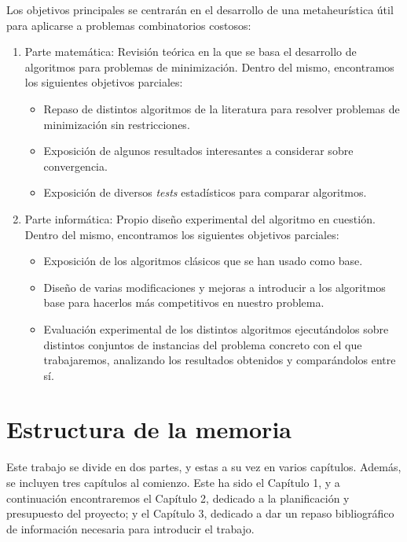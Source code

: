 Los objetivos principales se centrarán en el desarrollo de una metaheurística útil para aplicarse a problemas combinatorios costosos:
\begin{enumerate}
	\item Parte matemática: Revisión teórica en la que se basa el desarrollo de algoritmos para problemas de minimización. 
	Dentro del mismo, encontramos los siguientes objetivos parciales:
	\begin{itemize}
		\item Repaso de distintos algoritmos de la literatura para resolver problemas de minimización sin restricciones. 
		\item Exposición de algunos resultados interesantes a considerar sobre convergencia. 
		\item Exposición de diversos \textit{tests} estadísticos para comparar algoritmos. 
	\end{itemize}
	
	\item Parte informática: Propio diseño experimental del algoritmo en cuestión. 
	Dentro del mismo, encontramos los siguientes objetivos parciales: 
	\begin{itemize}
		\item Exposición de los algoritmos clásicos que se han usado como base.
		\item Diseño de varias modificaciones y mejoras a introducir a los algoritmos base para hacerlos más competitivos en nuestro problema. 
		\item Evaluación experimental de los distintos algoritmos ejecutándolos sobre distintos conjuntos de instancias del problema concreto con el que trabajaremos, analizando los resultados obtenidos y comparándolos entre sí.
	\end{itemize}
	
\end{enumerate}

\section{Estructura de la memoria}

Este trabajo se divide en dos partes, y estas a su vez en varios capítulos. 
Además, se incluyen tres capítulos al comienzo. 
Este ha sido el Capítulo 1, y a continuación encontraremos el Capítulo 2, dedicado a la planificación y presupuesto del proyecto; y el Capítulo 3, dedicado a dar un repaso bibliográfico de información necesaria para introducir el trabajo.

